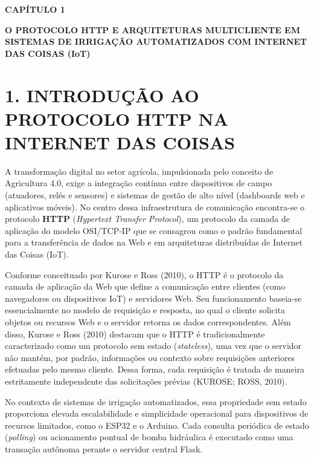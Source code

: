 
\begin{center}
\textbf{\fontsize{14}{16}\selectfont CAPÍTULO 1}

\vspace{0.5em}

\textbf{\fontsize{14}{16}\selectfont O PROTOCOLO HTTP E ARQUITETURAS MULTICLIENTE EM SISTEMAS DE IRRIGAÇÃO AUTOMATIZADOS COM INTERNET DAS COISAS (IoT)}
\end{center}

\vspace{1.5em}

\section*{1. INTRODUÇÃO AO PROTOCOLO HTTP NA INTERNET DAS COISAS}

A transformação digital no setor agrícola, impulsionada pelo conceito de Agricultura 4.0, exige a integração contínua entre dispositivos de campo (atuadores, relés e sensores) e sistemas de gestão de alto nível (dashboards web e aplicativos móveis). No centro dessa infraestrutura de comunicação encontra-se o protocolo \textbf{HTTP} (\textit{Hypertext Transfer Protocol}), um protocolo da camada de aplicação do modelo OSI/TCP-IP que se consagrou como o padrão fundamental para a transferência de dados na Web e em arquiteturas distribuídas de Internet das Coisas (IoT).

Conforme conceituado por Kurose e Ross (2010), o HTTP é o protocolo da camada de aplicação da Web que define a comunicação entre clientes (como navegadores ou dispositivos IoT) e servidores Web. Seu funcionamento baseia-se essencialmente no modelo de requisição e resposta, no qual o cliente solicita objetos ou recursos Web e o servidor retorna os dados correspondentes. Além disso, Kurose e Ross (2010) destacam que o HTTP é tradicionalmente caracterizado como um protocolo sem estado (\textit{stateless}), uma vez que o servidor não mantém, por padrão, informações ou contexto sobre requisições anteriores efetuadas pelo mesmo cliente. Dessa forma, cada requisição é tratada de maneira estritamente independente das solicitações prévias (KUROSE; ROSS, 2010).

No contexto de sistemas de irrigação automatizados, essa propriedade sem estado proporciona elevada escalabilidade e simplicidade operacional para dispositivos de recursos limitados, como o ESP32 e o Arduino. Cada consulta periódica de estado (\textit{polling}) ou acionamento pontual de bomba hidráulica é executado como uma transação autônoma perante o servidor central Flask.

